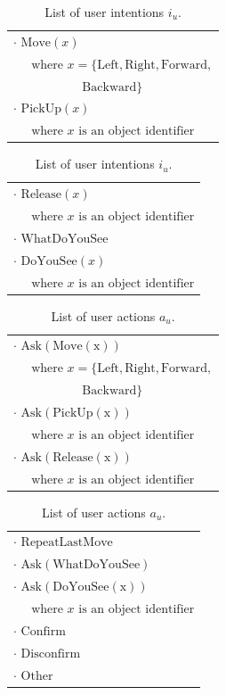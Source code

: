 \renewcommand{\arraystretch}{1.3}

\begin{table}[p]
\begin{footnotesize}
\begin{tabular}{p{60mm}} 
$\cdot$ $\mathrm{Move}(x) $ \\ $ \ \ \ \ \ \text{ where } x=\{\mathrm{Left,Right,Forward,}$ \\ $\ \ \ \ \ \ \ \ \ \ \ \ \ \ \ \ \ \ \ \ \ \ \ \ \ \mathrm{Backward}\} $ \\ 
$\cdot$ $\mathrm{PickUp}(x) $ \\ $\ \ \ \ \  \text{ where } x \text{ is an object identifier}$ 
\end{tabular}
\hspace{2cm}
\begin{tabular}{p{60mm}} 
$\cdot$ $\mathrm{Release}(x) $ \\ $\ \ \ \ \  \text{ where } x \text{ is an object identifier}$ \\
$\cdot$ $\mathrm{WhatDoYouSee}$ \\
$\cdot$ $\mathrm{DoYouSee}(x) $ \\ $\ \ \ \ \  \text{ where } x \text{ is an object identifier}$ 
\end{tabular}
\end{footnotesize}
 \caption{List of user intentions $i_u$.} 
\label{table:userintents_exp2}
\end{table}


\begin{table}[p]
\begin{footnotesize}
\begin{tabular}{p{60mm}} 
$\cdot$ $\mathrm{Ask(Move(x))} $ \\ $ \ \ \ \ \ \text{ where } x=\{\mathrm{Left,Right,Forward,}$ \\ $\ \ \ \ \ \ \ \ \ \ \ \ \ \ \ \ \ \ \ \ \ \ \ \ \ \mathrm{Backward}\} $ \\ 
$\cdot$ $\mathrm{Ask(PickUp(x))} $ \\ $\ \ \ \ \  \text{ where } x \text{ is an object identifier}$ \\
$\cdot$ $\mathrm{Ask(Release(x))} $ \\ $\ \ \ \ \  \text{ where } x \text{ is an object identifier}$ 
\end{tabular}
\hspace{2cm}
\begin{tabular}{p{60mm}} 
$\cdot$ $\mathrm{RepeatLastMove}$ \\
$\cdot$ $\mathrm{Ask(WhatDoYouSee)}$ \\
$\cdot$ $\mathrm{Ask(DoYouSee(x))} $ \\ $\ \ \ \ \  \text{ where } x \text{ is an object identifier}$ \\
$\cdot$ $\mathrm{Confirm}$ \\
$\cdot$ $\mathrm{Disconfirm}$ \\
$\cdot$ $\mathrm{Other}$ 
\end{tabular}
\end{footnotesize}
 \caption{List of user actions $a_u$.} 
\label{table:userdas_exp2}
\end{table}

